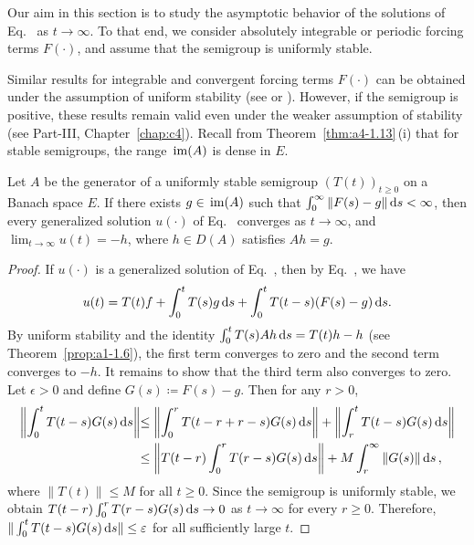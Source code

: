Our aim in this section is to study the asymptotic behavior of the solutions of Eq.~ as $t \to \infty$. 
To that end, we consider absolutely integrable or periodic forcing terms $F(\cdot)$, and assume that the semigroup
is uniformly stable.

Similar results for integrable and convergent forcing terms $F(\cdot)$ can
be obtained under the assumption of uniform stability (see \textcite[p.119]{pazy:1983} or \textcite{neubrander:1985b}). 
However, if the
semigroup is positive, these results remain valid even under the weaker assumption of stability (see Part-III, Chapter~\ref{chap:c4}).
Recall from Theorem~\ref{thm:a4-1.13}\,(i) that for stable
semigroups, the range $\mathop{}\mathrm{im}(A)$ is dense in $E$.
\begin{theorem}\label{thm:a4-2.1}
Let $A$ be the generator of a uniformly stable semigroup
$(T(t))_{t \geq 0}$ on a Banach space $E$. 
If there exists $g \in \mathop{}\mathrm{im}(A)$ such that
$\int_{0}^{\infty} \|F(s) - g\|  \mathop{}\!\mathrm{d}{s} < \infty$, then every generalized solution $u(\cdot)$ of
Eq.~ converges as $t \to \infty$, and $\lim_{t \to \infty} u(t) = -h$, where $h \in D(A)$ satisfies
$Ah = g$.
\end{theorem}
\begin{proof}
If\/ $u(\cdot)$ is a generalized solution of Eq.~, then by Eq.~, we have
\[
u(t) = T(t)f + \int_{0}^{t} T(s)g  \mathop{}\!\mathrm{d}{s} + \int_{0}^{t} T(t-s)(F(s)-g)  \mathop{}\!\mathrm{d}{s}.
\]
By uniform
stability and the identity $\int_0^t T(s)Ah \mathop{}\!\mathrm{d}{s} = T(t)h - h$ (see Theorem~\ref{prop:a1-1.6}), the first term converges to zero
and the second term converges to $-h$. 
It remains to show that the
third term also converges to zero. 
Let $\epsilon > 0$ and define $G(s) \coloneq F(s)-g$. 
Then for any $r>0$,
\begin{align*}
\left\|\int_{0}^{t} T(t-s)G(s)  \ds\right\| & 
{\leq \left\|\int_{0}^{r} T(t-r+r-s)G(s)  \ds\right\| + \left\|\int_{r}^{t} T(t-s)G(s)  \ds\right\|}\\
& 
{\leq \left\|T(t-r)\int_{0}^{r} T(r-s)G(s)  \ds\right\| + M \int_{r}^{\infty} \|G(s)\|  \ds\,},
\end{align*}
where $\|T(t)\| \leq M$ for all $t \geq 0$. Since the semigroup is uniformly stable, we obtain
$T(t-r)\int_{0}^{r} T(r-s)G(s)  \mathop{}\!\mathrm{d}{s} \to 0$ as $t \to \infty$ for every $r \geq 0$.
Therefore, $\|\int_{0}^{t} T(t-s)G(s)  \ds\| \leq \epsilon$ for all sufficiently large $t$.
\end{proof}

